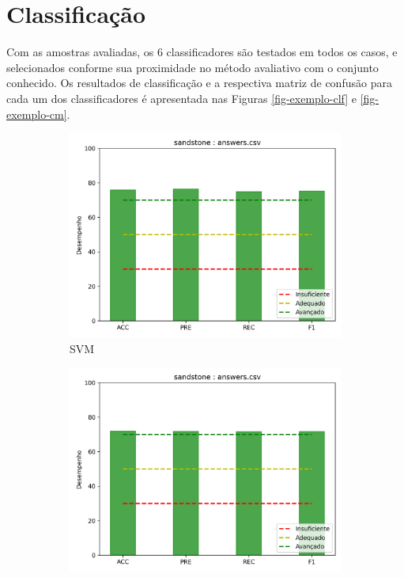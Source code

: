 \newpage 

\section{Classificação}

Com as amostras avaliadas, os 6 classificadores são testados em todos os casos, e selecionados conforme sua proximidade no método avaliativo com o conjunto conhecido. Os resultados de classificação e a respectiva matriz de confusão para cada um dos classificadores é apresentada nas Figuras \ref{fig-exemplo-clf} e \ref{fig-exemplo-cm}.

\begin{figure}[!h]
\begin{subfigure}{0.4\textwidth}
 \centering
 \includegraphics[width=\textwidth]{figuras/exemplo/sandstone-evalSVM.png}
 \caption{SVM}
\end{subfigure}
\hfill
\begin{subfigure}{0.4\textwidth}
 \centering
 \includegraphics[width=\textwidth]{figuras/exemplo/sandstone-evalKNN.png}

\end{subfigure}
\end{figure}
